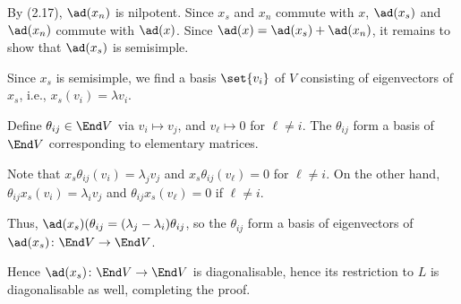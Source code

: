 By (2.17), $\ad(x_n)$ is nilpotent. Since $x_s$ and $x_n$ commute with $x$,
$\ad(x_s)$ and $\ad(x_n)$ commute with $\ad(x)$. Since $\ad(x) = \ad(x_s) + \ad(x_n)$,
it remains to show that $\ad(x_s)$ is semisimple.

Since $x_s$ is semisimple, we find a basis $\set{v_i}$ of $V$ consisting of eigenvectors
of $x_s$, i.e., $x_s(v_i) = \lambda v_i$.

Define $\theta_{ij} \in \End V$ via $v_i\mapsto v_j$, and $v_{\ell}\mapsto 0$ for
$\ell\neq i$. The $\theta_{ij}$ form a basis of $\End V$ corresponding to elementary
matrices.

Note that $x_s\theta_{ij}(v_i) = \lambda_jv_j$ and $x_s\theta_{ij}(v_{\ell}) = 0$
for $\ell\neq i$. On the other hand, $\theta_{ij}x_s(v_i) = \lambda_i v_j$ and
$\theta_{ij}x_s(v_{\ell}) = 0$ if $\ell\neq i$.

Thus, $\ad(x_s)(\theta_{ij} = (\lambda_j - \lambda_i)\theta_{ij}$, so the
$\theta_{ij}$ form a basis of eigenvectors of $\ad(x_s)\colon \End V\to \End V$.

Hence $\ad(x_s)\colon \End V\to \End V$ is diagonalisable, hence its restriction
to $L$ is diagonalisable as well, completing the proof.
